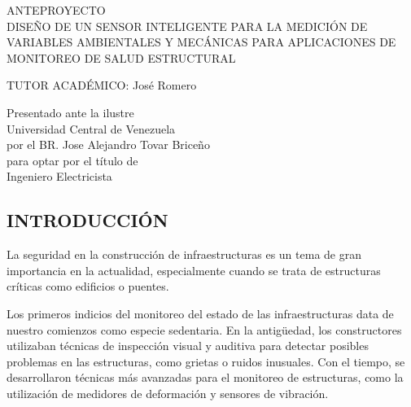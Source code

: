 \documentclass[12pt,letterpaper]{article}
\author{} %
\date{FECHA} %
\begin{document}
\renewcommand{\listfigurename}{Lista de Figuras}
\renewcommand{\listtablename}{Lista de Tablas}
\renewcommand{\contentsname}{Lista de Contenidos}
\renewcommand{\figurename}{Figura}
\renewcommand{\tablename}{Tabla}


\begin{center}

	\vspace{3cm} ANTEPROYECTO \\

	\vspace{8cm} DISEÑO DE UN SENSOR INTELIGENTE PARA LA MEDICIÓN DE VARIABLES AMBIENTALES Y MECÁNICAS PARA APLICACIONES DE MONITOREO DE SALUD ESTRUCTURAL
\end{center}


\vspace{6cm}

\begin{flushleft}
	TUTOR ACADÉMICO: José Romero \\
\end{flushleft}


\begin{flushright}

	Presentado ante la ilustre\\
	Universidad Central de Venezuela\\
	por el BR. Jose Alejandro Tovar Briceño \\
	para optar por el título de \\
	Ingeniero Electricista   \\

\end{flushright}


\vspace{2cm}
\thispagestyle{empty}
\newpage


\begin{center}
	\section*{ INTRODUCCIÓN}
\end{center}

La seguridad en la construcción de infraestructuras es un tema de gran importancia en la actualidad, especialmente cuando se trata de estructuras críticas como edificios o puentes.

Los primeros indicios del monitoreo del estado de las infraestructuras data de nuestro comienzos como especie sedentaria.  En la antigüedad, los constructores utilizaban técnicas de inspección visual y auditiva para detectar posibles problemas en las estructuras, como grietas o ruidos inusuales. Con el tiempo, se desarrollaron técnicas más avanzadas para el monitoreo de estructuras, como la utilización de medidores de deformación y sensores de vibración.
\end{document}
